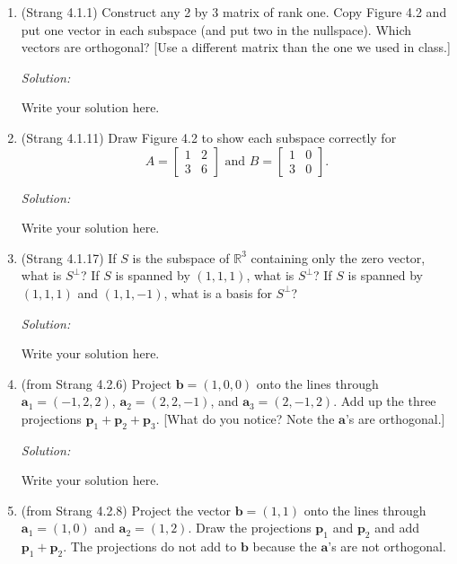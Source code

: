 \documentclass[11pt]{article}
\newcommand{\R}{\ensuremath{\mathbb R}}
\renewcommand{\vec}[1]{\ensuremath{\mathbf{#1}}}
\newenvironment{sol}
    {\emph{Solution:}
    }
\newcommand{\headings}{
\large{\textbf{YOUR NAME GOES HERE \hfill 21-241 Fall 2019}\\
\textbf{Homework 5 \hfill Due Friday, September 27}}\\
\rule[0.1in]{\textwidth}{0.01in}
}
\begin{document}
\headings

\begin{enumerate}
\section*{Required Problems}
\item (Strang 4.1.1) Construct any 2 by 3 matrix of rank one.  Copy Figure 4.2 and put one vector in each subspace (and put two in the nullspace).  Which vectors are orthogonal? [Use a different matrix than the one we used in class.]

 \begin{sol}
Write your solution here.
\end{sol}
\clearpage

\item (Strang 4.1.11) Draw Figure 4.2 to show each subspace correctly for 
\[A = \begin{bmatrix} 1 & 2 \\ 3 & 6 \end{bmatrix} \text{ and } B = \begin{bmatrix} 1 & 0 \\ 3 & 0 \end{bmatrix}.  \]

 \begin{sol}
Write your solution here.
\end{sol}
\clearpage

\item (Strang 4.1.17) If $S$ is the subspace of $\R^3$ containing only the zero vector, what is $S^\perp$? If $S$ is spanned by $(1,1,1)$, what is $S^\perp$?  If $S$ is spanned by $(1,1,1)$ and $(1,1,-1)$, what is a basis for $S^\perp$?

 \begin{sol}
Write your solution here.
\end{sol}
\clearpage

\item (from Strang 4.2.6) Project $\vec{b} = (1,0,0)$ onto the lines through $\vec{a}_1 = (-1, 2, 2)$, $\vec{a}_2 = (2,2,-1)$, and $\vec{a}_3 = (2,-1,2)$.  Add up the three projections $\vec{p}_1 + \vec{p}_2 + \vec{p}_3$. [What do you notice?  Note the $\vec{a}$'s are orthogonal.]

 \begin{sol}
Write your solution here.
\end{sol}
\clearpage

\item (from Strang 4.2.8) Project the vector $\vec{b} = (1,1)$ onto the lines through $\vec{a}_1 = (1,0)$ and $\vec{a}_2 = (1,2)$. Draw the projections $\vec{p}_1$ and $\vec{p}_2$ and add $\vec{p}_1 + \vec{p}_2$. The projections do not add to $\vec{b}$ because the $\vec{a}$'s are not orthogonal.


\end{enumerate}
\end{document}
